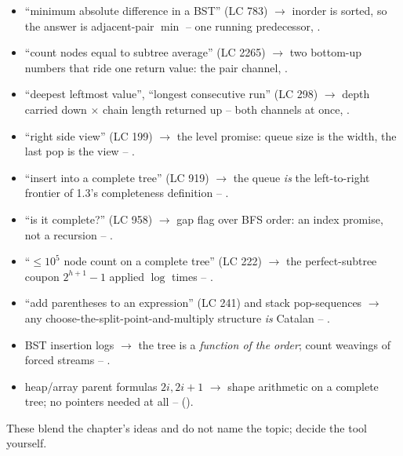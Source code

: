 \begin{itemize}[nosep, leftmargin=1.4em]
  \item ``minimum absolute difference in a BST'' (LC 783) $\longrightarrow$ inorder is
        sorted, so the answer is adjacent-pair $\min$ -- one running predecessor, .
  \item ``count nodes equal to subtree average'' (LC 2265) $\longrightarrow$ two
        bottom-up numbers that ride one return value: the pair channel, .
  \item ``deepest leftmost value'', ``longest consecutive run'' (LC 298) $\longrightarrow$
        depth carried down $\times$ chain length returned up -- both channels at once, .
  \item ``right side view'' (LC 199) $\longrightarrow$ the level promise: queue size is
        the width, the last pop is the view -- .
  \item ``insert into a complete tree'' (LC 919) $\longrightarrow$ the queue \emph{is}
        the left-to-right frontier of 1.3's completeness definition -- .
  \item ``is it complete?'' (LC 958) $\longrightarrow$ gap flag over BFS order: an index
        promise, not a recursion -- .
  \item ``$\le 10^5$ node count on a complete tree'' (LC 222) $\longrightarrow$ the
        perfect-subtree coupon $2^{h+1}-1$ applied $\log$ times -- .
  \item ``add parentheses to an expression'' (LC 241) and stack pop-sequences
        $\longrightarrow$ any choose-the-split-point-and-multiply structure \emph{is}
        Catalan -- .
  \item BST insertion logs $\longrightarrow$ the tree is a \emph{function of the order};
        count weavings of forced streams -- .
  \item heap/array parent formulas $2i, 2i{+}1$ $\longrightarrow$ shape arithmetic on a
        complete tree; no pointers needed at all --  ().
\end{itemize}


These blend the chapter's ideas and do not name the topic; decide the tool yourself.

